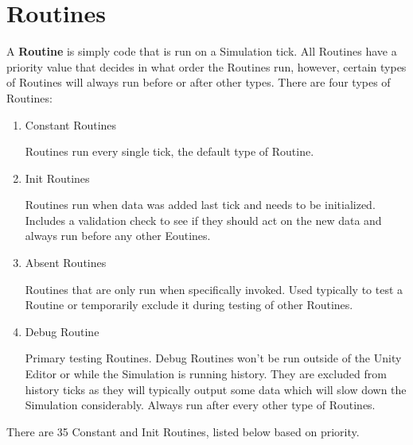 \documentclass{report}
\begin{document}
\section{Routines}

A \textbf{Routine} is simply code that is run on a Simulation tick. All Routines have a priority value that decides in what order the Routines run, however, certain types of Routines will always run before or after other types. There are four types of Routines:

\begin{enumerate}
        \item Constant Routines

Routines run every single tick, the default type of Routine.

        \item Init Routines

Routines run when data was added last tick and needs to be initialized. Includes a validation check to see if they should act on the new data and always run before any other Eoutines.

        \item Absent Routines

Routines that are only run when specifically invoked. Used typically to test a Routine or temporarily exclude it during testing of other Routines.

        \item Debug Routine

Primary testing Routines. Debug Routines won't be run outside of the Unity Editor or while the Simulation is running history. They are excluded from history ticks as they will typically output some data which will slow down the Simulation considerably. Always run after every other type of Routines.

\end{enumerate}

There are 35 Constant and Init Routines, listed below based on priority.
\end{document}
